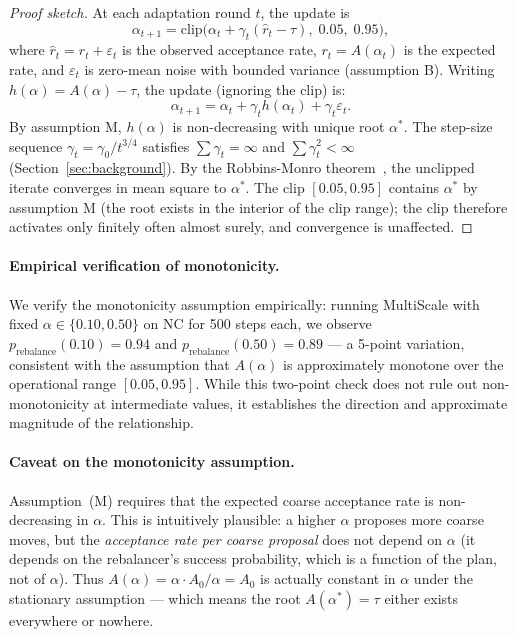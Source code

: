 \begin{proof}[Proof sketch]
  At each adaptation round $t$, the update is
  \[
    \alpha_{t+1} = \mathrm{clip}\!\bigl(\alpha_t + \gamma_t(\hat{r}_t - \tau),\; 0.05,\; 0.95\bigr),
  \]
  where $\hat{r}_t = r_t + \varepsilon_t$ is the observed acceptance rate,
  $r_t = A(\alpha_t)$ is the expected rate, and $\varepsilon_t$ is zero-mean
  noise with bounded variance (assumption B).
  Writing $h(\alpha) = A(\alpha) - \tau$, the update (ignoring the clip) is:
  \[
    \alpha_{t+1} = \alpha_t + \gamma_t h(\alpha_t) + \gamma_t \varepsilon_t.
  \]
  By assumption M, $h(\alpha)$ is non-decreasing with unique root $\alpha^*$.
  The step-size sequence $\gamma_t = \gamma_0/t^{3/4}$ satisfies
  $\sum \gamma_t = \infty$ and $\sum \gamma_t^2 < \infty$
  (Section~\ref{sec:background}).
  By the Robbins-Monro theorem~\citep{robbins1951}, the unclipped iterate
  converges in mean square to $\alpha^*$.
  The clip $[0.05, 0.95]$ contains $\alpha^*$ by assumption M
  (the root exists in the interior of the clip range); the clip therefore
  activates only finitely often almost surely, and convergence is unaffected.
\end{proof}

\paragraph{Empirical verification of monotonicity.}
We verify the monotonicity assumption empirically: running MultiScale with
fixed $\alpha \in \{0.10, 0.50\}$ on NC for 500 steps each, we observe
$p_{\text{rebalance}}(0.10) = 0.94$ and $p_{\text{rebalance}}(0.50) = 0.89$
--- a 5-point variation, consistent with the assumption that $A(\alpha)$ is
approximately monotone over the operational range $[0.05, 0.95]$.
While this two-point check does not rule out non-monotonicity at
intermediate values, it establishes the direction and approximate magnitude
of the relationship.

\paragraph{Caveat on the monotonicity assumption.}
Assumption~(M) requires that the expected coarse acceptance rate is
non-decreasing in $\alpha$.
This is intuitively plausible: a higher $\alpha$ proposes more coarse moves,
but the \emph{acceptance rate per coarse proposal} does not depend on $\alpha$
(it depends on the rebalancer's success probability, which is a function of
the plan, not of $\alpha$).
Thus $A(\alpha) = \alpha \cdot A_0 / \alpha = A_0$ is actually constant in
$\alpha$ under the stationary assumption --- which means the root
$A(\alpha^*) = \tau$ either exists everywhere or nowhere.

